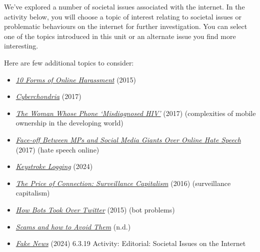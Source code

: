 \documentclass[
  letterpaper,
  DIV=11,
  numbers=noendperiod]{scrreprt}
\providecommand{\tightlist}{%
  \setlength{\itemsep}{0pt}\setlength{\parskip}{0pt}}\usepackage{longtable,booktabs,array}
\begin{document}
We've explored a number of societal issues associated with the internet.
In the activity below, you will choose a topic of interest relating to
societal issues or problematic behaviours on the internet for further
investigation. You can select one of the topics introduced in this unit
or an alternate issue you find more interesting.

Here are few additional topics to consider:

\begin{itemize}
\tightlist
\item
  \href{https://computer.howstuffworks.com/10-forms-online-harassment.htm}{\emph{10
  Forms of Online Harassment}} (2015)
\item
  \href{https://karger.com/pps/article/86/3/129/282998/Cyberchondria-Challenges-of-Problematic-Online}{\emph{Cyberchondria}}
  (2017)
\item
  \href{https://www.bbc.com/news/technology-39371100}{\emph{The Woman
  Whose Phone `Misdiagnosed HIV'}} (2017) (complexities of mobile
  ownership in the developing world)
\item
  \href{https://www.theguardian.com/media/2017/mar/14/face-off-mps-and-social-media-giants-online-hate-speech-facebook-twitter}{\emph{Face-off
  Between MPs and Social Media Giants Over Online Hate Speech}} (2017)
  (hate speech online)
\item
  \href{https://en.wikipedia.org/wiki/Keystroke_logging}{\emph{Keystroke
  Logging}} (2024)
\item
  \href{https://theconversation.com/the-price-of-connection-surveillance-capitalism-64124}{\emph{The
  Price of Connection: Surveillance Capitalism}} (2016) (surveillance
  capitalism)
\item
  \emph{\href{https://hbr.org/2015/06/how-bots-took-over-twitter}{How
  Bots Took Over Twitter}} (2015) (bot problems)
\item
  \href{https://www.consumer.org.nz/articles/scams?gclid=EAIaIQobChMIrOzE7qX71AIVxBiPCh0uzAKrEAAYASAAEgIXf_D_BwE}{\emph{Scams
  and how to Avoid Them}} (n.d.)
\item
  \href{https://en.wikipedia.org/wiki/Fake_news}{\emph{Fake News}}
  (2024) 6.3.19 Activity: Editorial: Societal Issues on the Internet
\end{itemize}
\end{document}
